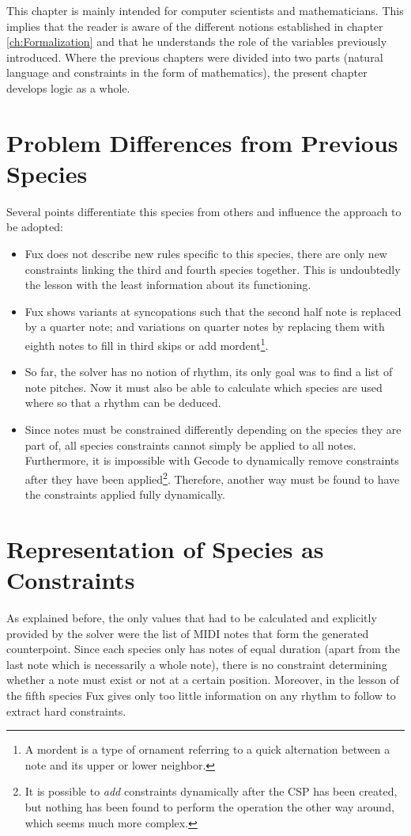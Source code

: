 This chapter is mainly intended for computer scientists and mathematicians. This implies that the reader is aware of the different notions established in chapter \ref{ch:Formalization} and that he understands the role of the variables previously introduced. Where the previous chapters were divided into two parts (natural language and constraints in the form of mathematics), the present chapter develops logic as a whole.

\section{Problem Differences from Previous Species}
Several points differentiate this species from others and influence the approach to be adopted:
\begin{itemize}[wide]
    \item Fux does not describe new rules specific to this species, there are only new constraints linking the third and fourth species together. This is undoubtedly the lesson with the least information about its functioning.
    \item Fux shows variants at syncopations such that the second half note is replaced by a quarter note; and variations on quarter notes by replacing them with eighth notes to fill in third skips or add mordent\footnote{A mordent is a type of ornament referring to a quick alternation between a note and its upper or lower neighbor.\parencite{Mordent}}.
    \item So far, the solver has no notion of rhythm, its only goal was to find a list of note pitches. Now it must also be able to calculate which species are used where so that a rhythm can be deduced.
    \item Since notes must be constrained differently depending on the species they are part of, all species constraints cannot simply be applied to all notes. Furthermore, it is impossible with Gecode to dynamically remove constraints after they have been applied\footnote{It is possible to \emph{add} constraints dynamically after the CSP has been created, but nothing has been found to perform the operation the other way around, which seems much more complex.}. Therefore, another way must be found to have the constraints applied fully dynamically.
\end{itemize}

\section{Representation of Species as Constraints}
As explained before, the only values that had to be calculated and explicitly provided by the solver were the list of MIDI notes that form the generated counterpoint. Since each species only has notes of equal duration (apart from the last note which is necessarily a whole note), there is no constraint determining whether a note must exist or not at a certain position. Moreover, in the lesson of the fifth species Fux gives only too little information on any rhythm to follow to extract hard constraints.

